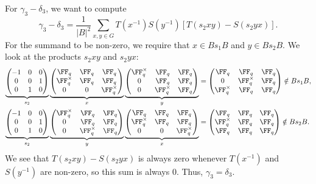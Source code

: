 \documentclass[11pt]{amsart}
\theoremstyle{remark}
\begin{document}
For $\gamma_3-\delta_3$, we want to compute
\[
	\gamma_3-\delta_3 = \frac{1}{|B|^2}\sum_{x,y\in G} T(x^{-1})S(y^{-1})[T(s_2xy)-S(s_2yx)].
\]
For the summand to be non-zero, we require that $x\in Bs_1B$ and $y\in Bs_2B$.
We look at the products $s_2xy$ and $s_2yx$:
\begin{align*}
	\underbrace{\begin{pmatrix}
			-1 & 0 & 0 \\
			0  & 0 & 1 \\
			0  & 1 & 0
		\end{pmatrix}}_{s_2}
	\underbrace{\begin{pmatrix}
			\FF_q        & \FF_q & \FF_q        \\
			\FF_q^\times & \FF_q & \FF_q        \\
			0            & 0     & \FF_q^\times
		\end{pmatrix}}_{x}
	\underbrace{\begin{pmatrix}
			\FF_q^\times & \FF_q        & \FF_q \\
			0            & \FF_q        & \FF_q \\
			0            & \FF_q^\times & \FF_q
		\end{pmatrix}}_{y} & =
	\begin{pmatrix}
		\FF_q        & \FF_q        & \FF_q \\
		0            & \FF_q^\times & \FF_q \\
		\FF_q^\times & \FF_q        & \FF_q
	\end{pmatrix}\notin Bs_1B,         \\
	\underbrace{\begin{pmatrix}
			-1 & 0 & 0 \\
			0  & 0 & 1 \\
			0  & 1 & 0
		\end{pmatrix}}_{s_2}
	\underbrace{\begin{pmatrix}
			\FF_q^\times & \FF_q        & \FF_q \\
			0            & \FF_q        & \FF_q \\
			0            & \FF_q^\times & \FF_q
		\end{pmatrix}}_{y}
	\underbrace{\begin{pmatrix}
			\FF_q        & \FF_q & \FF_q        \\
			\FF_q^\times & \FF_q & \FF_q        \\
			0            & 0     & \FF_q^\times
		\end{pmatrix}}_{x} & =
	\begin{pmatrix}
		\FF_q        & \FF_q & \FF_q \\
		\FF_q^\times & \FF_q & \FF_q \\
		\FF_q        & \FF_q & \FF_q
	\end{pmatrix}\notin Bs_2B.
\end{align*}
We see that $T(s_2xy)-S(s_2yx)$ is always zero whenever $T(x^{-1})$ and $S(y^{-1})$ are non-zero, so this sum is always $0$.
Thus, $\gamma_3=\delta_3$.
\end{document}
